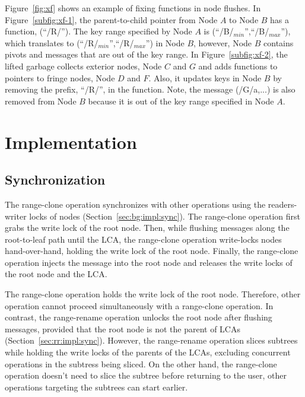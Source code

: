 Figure~\ref{fig:xf} shows an example of fixing \xf functions in node flushes.
In Figure~\ref{subfig:xf-1}, the parent-to-child pointer from Node $A$ to
Node $B$ has a \xf function, \xf(``/R/'').
The key range specified by Node $A$ is (``/B/$_{min}$'',``/B/$_{max}$''), which
translates to (``/R/$_{min}$'',``/R/$_{max}$'') in Node $B$,
however, Node $B$ contains pivots and messages that are out of the key range.
In Figure~\ref{subfig:xf-2}, the lifted \bedag garbage collects exterior nodes,
Node $C$ and $G$
and adds \xf functions to pointers to fringe nodes, Node $D$ and $F$.
Also, it updates keys in Node $B$ by removing the prefix, ``/R/'',
in the \xf function.
Note, the message \putm(/G/a,...) is also removed from Node $B$
because it is out of the key range specified in Node $A$.

\section{Implementation}
\label{sec:rc:impl}

\subsection{Synchronization}

The range-clone operation synchronizes with other \bet operations using the
readers-writer locks of \bet nodes
(Section~\ref{sec:bg:impl:sync}).
The range-clone operation first grabs the write lock of the root node.
Then, while flushing messages along the root-to-leaf path until the LCA,
the range-clone operation write-locks \bet nodes hand-over-hand,
holding the write lock of the root node.
Finally, the range-clone operation injects the \goto message into the root node
and releases the write locks of the root node and the LCA.

The range-clone operation holds the write lock of the root node.
Therefore, other operation cannot proceed simultaneously with a range-clone
operation.
In contrast, the range-rename operation unlocks the root node after flushing
messages, provided that the root node is not the parent of LCAs
(Section~\ref{sec:rr:impl:sync}).
However, the range-rename operation slices subtrees while holding the write
locks of the parents of the LCAs,
excluding concurrent \bet operations in the subtress being sliced.
On the other hand,
the range-clone operation doesn't need to slice the subtree before returning to
the user,
other \bet operations targeting the subtrees can start earlier.

